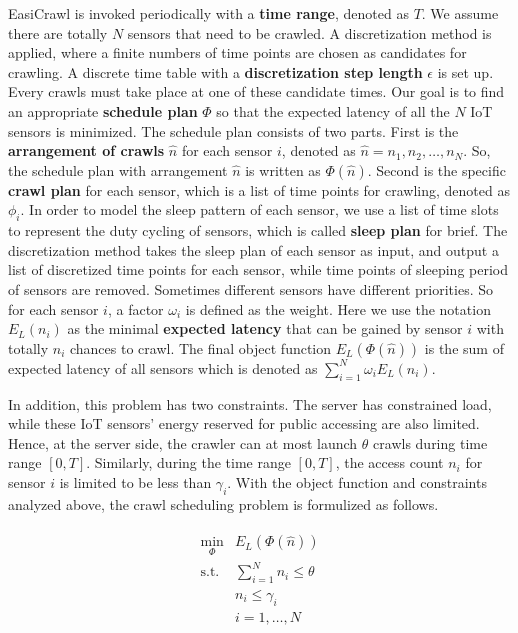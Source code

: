 \documentclass[conference]{IEEEtran}
\begin{document}
EasiCrawl is invoked periodically with a \textbf{time range}, denoted as $T$.
We assume there are totally $N$ sensors that need to be crawled.
A discretization method is applied, where a finite numbers of time points are chosen as candidates for crawling.
A discrete time table with a \textbf{discretization step length} $\epsilon$ is set up. 
Every crawls must take place at one of these candidate times.
Our goal is to find an appropriate \textbf{schedule plan} $\Phi$ so that the expected latency of all the $N$ IoT sensors is minimized. 
The schedule plan consists of two parts. 
First is the \textbf{arrangement of crawls} $\hat{n}$ for each sensor $i$, denoted as $\hat{n}=n_1,n_2,\ldots,n_{N}$. 
So, the schedule plan with arrangement $\hat{n}$ is written as $\Phi(\hat{n})$.
Second is the specific \textbf{crawl plan} for each sensor, which is a list of time points for crawling, denoted as $\phi_{i}$.
In order to model the sleep pattern of each sensor, we use a list of time slots to represent the duty cycling of sensors, which is called \textbf{sleep plan} for brief. 
The discretization method takes the sleep plan of each sensor as input, and output a list of discretized time points for each sensor, while time points of sleeping period of sensors are removed.
Sometimes different sensors have different priorities.
So for each sensor $i$, a factor $\omega_i$ is defined as the weight. 
Here we use the notation $E_{L}(n_{i})$ as the minimal \textbf{expected latency} that can be gained by sensor $i$ with totally $n_i$ chances to crawl.
The final object function $E_L(\Phi(\hat{n}))$ is the sum of expected latency of all sensors which is denoted as $\sum_{i=1}^{N} \omega_i E_{L}(n_{i})$.

In addition, this problem has two constraints. 
The server has constrained load, while these IoT sensors' energy reserved for public accessing are also limited.
Hence, at the server side, the crawler can at most launch $\theta$ crawls during time range $[0,T]$. 
Similarly, during the time range $[0, T]$, the access count $n_i$ for sensor $i$ is limited to be less than $\gamma_i$. 
With the object function and constraints analyzed above,  the crawl scheduling problem is formulized as follows.

\begin{eqnarray}
\begin{array}{ll}
\min_{\Phi}& E_L(\Phi(\hat{n}))\\
\text{s.t.}
& \sum_{i=1}^{N} n_i \leq\theta\\
&n_i\leq\gamma_i\\
&i=1,\ldots,N
\end{array}\label{OBJ}
\end{eqnarray}
\end{document}
